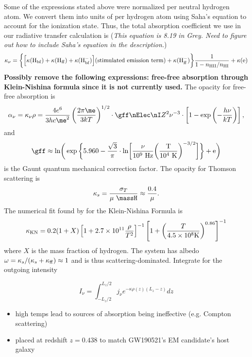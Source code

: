 Some of the expressions stated above were normalized per neutral hydrogen atom. We convert them into units of per hydrogen atom using Saha's equation to account for the ionization state. Thus, the total absorption coefficient we use in our radiative transfer calculation is (\textit{This equation is 8.19 in Grey. Need to figure out how to include Saha's equation in the description.})
\begin{equation}
    \kappa_{\nu} = \biggl\{ \Bigl[ \kappa({\rm H_{bf}}) + \kappa({\rm H_{ff}}) + \kappa({\rm H^-_{bf}}) \Bigr] ({\rm stimulated\ emission\ term}) + \kappa({\rm H_{ff}^-}) \biggr\} \frac{1}{1-n_{\rm HII}/n_{\rm HI}} + \kappa({\rm e})
\end{equation}
\textbf{Possibly remove the following expressions: free-free absorption through Klein-Nishina formula since it is not currently used.}
The opacity for free-free absorption is 
\begin{equation}
    \alpha_\nu = \kappa_{\nu} \rho = \frac{4e^6}{3 h c \me^2} \left( \frac{2\pi \me}{3kT} \right)^{1/2} \cdot \gff \nElec \nI Z^2 \nu^{-3} \cdot \left[ 1 - \exp \left(-\frac{h\nu}{kT}\right) \right],
\end{equation}
and
\begin{equation}
    \gff \approx \rm{ln} \bigg( \exp \bigg\{ 5.960 - \frac{\sqrt{3}}{\pi} \cdot ln \bigg[ \frac{\nu}{10^9\ \rm{Hz}} \bigg( \frac{T}{10^4\ \rm{K}} \bigg)^{-3/2} \bigg] \bigg\} + e \bigg)
\end{equation}
is the Gaunt quantum mechanical correction factor. The opacity for Thomson scattering is
\begin{equation}
\kappa_s = \frac{\sigma_T}{\mu\ \massH} \approx \frac{0.4}{\mu}.    
\end{equation}
The numerical fit found by \citet{BuchlerYueh76} for the Klein-Nishina Formula \citep{KleinNishina29} is 
\begin{equation}
    \kappa_{\rm KN} = 0.2 (1 + X) \left[ 1 + 2.7 \times 10^{11} \frac{\rho}{T^2} \right]^{-1} \left[ 1 + \left( \frac{T}{4.5\times10^8 {\rm K}} \right)^{0.86} \right]^{-1}
\end{equation}
where $X$ is the mass fraction of hydrogen. The system has albedo $\omega = \kappa_s/(\kappa_s + \kappa_{\rm ff})\approx 1$ and is thus scattering-dominated. Integrate for the outgoing intensity 
    
\begin{equation}
    I_\nu = \int_{-L_z/2}^{L_z/2} j_\nu e^{-\kappa \rho(z) (L_z-z)} dz     
\end{equation}

\begin{itemize}
    \item high temps lead to sources of absorption being ineffective (e.g. Compton scattering)
    \item placed at redshift $z=0.438$ to match GW190521's EM candidate's host galaxy
\end{itemize}
